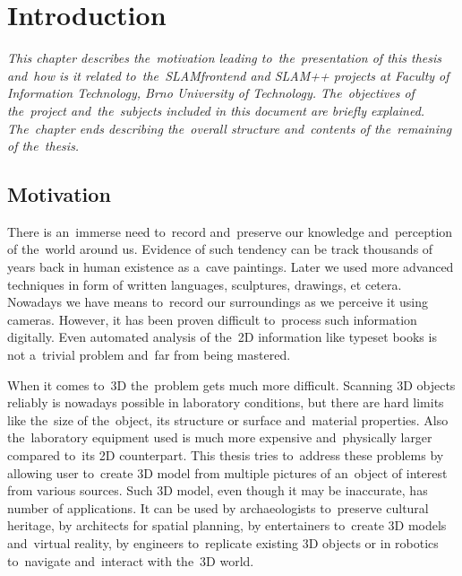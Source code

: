 \makeatletter
\renewcommand*\env@matrix[1][*\c@MaxMatrixCols c]{%
  \hskip -\arraycolsep
  \let\@ifnextchar\new@ifnextchar
  \array{#1}}
\makeatother

\chapter{Introduction}
\textit{This chapter describes the~motivation leading to~the~presentation of this thesis and~how is it related to~the~SLAM\textunderscore frontend and SLAM++ projects at Faculty of Information Technology, Brno University of Technology. The~objectives of the~project and~the~subjects included in this document are briefly explained. The~chapter ends describing the~overall structure and~contents of the~remaining of the~thesis.}

\section{Motivation}
There is an~immerse need to~record and~preserve our knowledge and~perception of the~world around us. Evidence of such tendency can be track thousands of years back in human existence as a~cave paintings. Later we used more advanced techniques in form of written languages, sculptures, drawings, et cetera. Nowadays we have means to~record our surroundings as we perceive it using cameras. However, it has been proven difficult to~process such information digitally. Even automated analysis of the~2D information like typeset books is not a~trivial problem and~far from being mastered.

When it comes to~3D the~problem gets much more difficult. Scanning 3D objects reliably is nowadays possible in laboratory conditions, but there are hard limits like the~size of the~object, its structure or surface and~material properties. Also the~laboratory equipment used is much more expensive and~physically larger compared to~its 2D counterpart. This thesis tries to~address these problems by allowing user to~create 3D model from multiple pictures of an~object of interest from various sources. Such 3D model, even though it may be inaccurate, has number of applications. It can be used by archaeologists to~preserve cultural heritage, by architects for spatial planning, by entertainers to~create 3D models and~virtual reality, by engineers to~replicate existing 3D objects or in robotics to~navigate and~interact with the~3D world.

